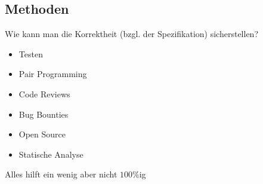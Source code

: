 \documentclass[aspectratio=169]{beamer}
\begin{document}
\subsection{Methoden}
\begin{frame}
  Wie kann man die Korrektheit (bzgl. der Spezifikation) sicherstellen?
  \begin{itemize}
  \item Testen
  \item Pair Programming
  \item Code Reviews
  \item Bug Bounties
  \item Open Source
  \item Statische Analyse \pause
  \end{itemize}
  \vfill
  Alles hilft ein wenig aber nicht $100\%$ig 
\end{frame}
\end{document}
